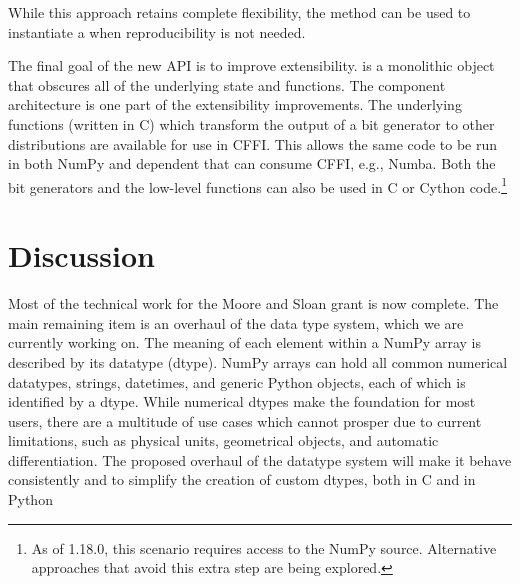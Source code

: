 \noindent While this approach retains complete flexibility, the method
 can be used to instantiate a  when
reproducibility is not needed.

The final goal of the new API is to improve extensibility.  is
a monolithic object that obscures all of the underlying state and functions. The
component architecture is one part of the extensibility improvements. The
underlying functions (written in C) which transform the output of a bit
generator to other distributions are available for use in CFFI. This allows the
same code to be run in both NumPy and dependent that can consume CFFI, e.g.,
Numba. Both the bit generators and the low-level functions can also be used in C
or Cython code.\footnote{As of 1.18.0, this scenario requires access to the
NumPy source. Alternative approaches that avoid this extra step are being
explored.} 

\section*{Discussion}


Most of the technical work for the Moore and Sloan grant is now complete.
The main remaining item is an overhaul of the data type system, which
we are currently working on.
The meaning of each element within a NumPy array is described by its
datatype (dtype). NumPy arrays can hold all common numerical
datatypes, strings, datetimes, and generic Python objects, each of
which is identified by a dtype.
While numerical dtypes make the foundation for most users,
there are a multitude of use cases which cannot prosper due to current
limitations, such as physical units\cite{astropy,Goldbaum2018,pint},
geometrical objects\cite{pygeos}, and automatic
differentiation\cite{pyadolc}.
The proposed overhaul of the datatype system will make it behave consistently and
to simplify the creation of custom dtypes, both in C and in Python

